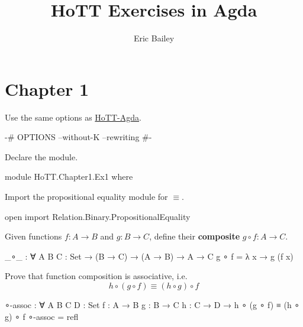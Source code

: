 \documentclass[12pt]{amsart}
\title{HoTT Exercises in Agda}
\author{Eric Bailey}
\begin{document}
\maketitle

\section{Chapter 1}

Use the same options as \href{https://github.com/HoTT/HoTT-Agda}{HoTT-Agda}.

\begin{code}
{-# OPTIONS --without-K --rewriting #-}
\end{code}

Declare the module.

\begin{code}
module HoTT.Chapter1.Ex1 where
\end{code}

Import the propositional equality module for $\equiv$.

\begin{code}
open import Relation.Binary.PropositionalEquality
\end{code}

Given functions $f : A \to B$ and $g : B \to C$, define their {\bf composite} $g \circ f : A \to C$.

\begin{code}
_∘_ : ∀ {A B C : Set} → (B → C) → (A → B) → A → C
g ∘ f = λ x → g (f x)
\end{code}

Prove that function composition is associative, i.e.
\[
  h \circ (g \circ f) \equiv (h \circ g) \circ f
\]

\begin{code}
∘-assoc : ∀ {A B C D : Set} {f : A → B} {g : B → C} {h : C → D} →
          h ∘ (g ∘ f) ≡ (h ∘ g) ∘ f
∘-assoc = refl
\end{code}
\end{document}
